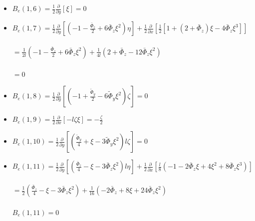 \documentclass[a4paper,11pt]{article}
\newcommand{\gr}{\textbf}
\begin{document}
\begin{itemize}[label=$\gr{-}$, font=\LARGE, font=\color{color1}, topsep = 0.2cm, itemsep=0.2cm]
	\item $B_e(1,6) = \frac{1}{2} \frac{\partial}{\partial y} \left[ \xi \right] = 0$
	\item $B_e(1,7) = \frac{1}{2} \frac{\partial}{\partial y} \left[ \left( - 1 - \frac{\bar{\Phi}_z}{2} + 6 \bar{\Phi}_z \xi^2 \right) \eta \right] + \frac{1}{2} \frac{\partial}{\partial x} \left[ \frac{1}{2} \left[1 + (2 + \bar{\Phi}_z)\xi - 4\bar{\Phi}_z\xi^3 \right] \right]$
	    \\ \\ \text{\hspace{13mm}} $ = \frac{1}{2l} \left( - 1 - \frac{\bar{\Phi}_z}{2} + 6 \bar{\Phi}_z \xi^2 \right) + \frac{1}{4l} \left( 2 + \bar{\Phi}_z - 12 \bar{\Phi}_z \xi^2 \right) $
	    \\ \\ \text{\hspace{13mm}} $ = 0$
	\item $B_e(1,8) = \frac{1}{2} \frac{\partial}{\partial y} \left[ \left( -1 + \frac{\tilde{\Phi}_y}{2} - 6 \tilde{\Phi}_y \xi^2 \right) \zeta \right] = 0$
	\item $B_e(1,9) = \frac{1}{2} \frac{\partial}{\partial x} \left[ - l \zeta \xi \right] = -\frac{\zeta}{2}$
	\item $B_e(1,10) = \frac{1}{2} \frac{\partial}{\partial y} \left[ \left( \frac{\tilde{\Phi}_y}{4} +\xi - 3 \tilde{\Phi}_y \xi^2 \right) l \zeta \right] = 0$
	\item $B_e(1,11) = \frac{1}{2} \frac{\partial}{\partial y} \left[ \left( \frac{\bar{\Phi}_z}{4} - \xi - 3 \bar{\Phi}_z \xi^2 \right) l \eta \right] + \frac{1}{2} \frac{\partial}{\partial x} \left[ \frac{l}{8}\left( -1 - 2\bar{\Phi}_z\xi + 4\xi^2 + 8\bar{\Phi}_z\xi^3 \right) \right]$
	    \\ \\ \text{\hspace{13mm}} $ = \frac{1}{2} \left( \frac{\bar{\Phi}_z}{4} - \xi - 3 \bar{\Phi}_z \xi^2 \right) + \frac{1}{16} \left( -2 \bar{\Phi}_z + 8 \xi + 24 \bar{\Phi}_z \xi^2 \right)$
	    \\ \\ $B_e(1,11) = 0$
\end{itemize}
\end{document}
